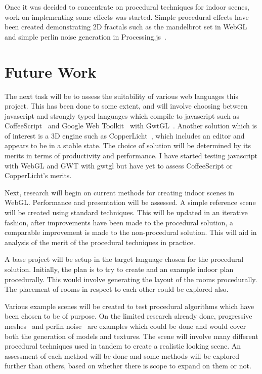 \documentclass[12pt]{article}
\begin{document}
Once it was decided to concentrate on procedural techniques for indoor scenes, work on implementing some effects was started.
Simple procedural effects have been created demonstrating 2D fractals such as the mandelbrot set in WebGL and simple perlin noise generation in Processing.js~\cite{processingjs:web}.

\section{Future Work}
The next task will be to assess the suitability of various web languages this project.
This has been done to some extent, and will involve choosing between javascript and strongly typed languages which compile to javascript such as CoffeeScript~\cite{coffeescript:web} and Google Web Toolkit~\cite{gwt:web} with GwtGL~\cite{gwtgl:web}.
Another solution which is of interest is a 3D engine such as CopperLicht~\cite{copperlicht:web}, which includes an editor and appears to be in a stable state.
The choice of solution will be determined by its merits in terms of productivity and performance.
I have started testing javascript with WebGL and GWT with gwtgl but have yet to assess CoffeeScript or CopperLicht's merits.

Next, research will begin on current methods for creating indoor scenes in WebGL.
Performance and presentation will be assessed.
A simple reference scene will be created using standard techniques.
This will be updated in an iterative fashion, after improvements have been made to the procedural solution, a comparable improvement is made to the non-procedural solution.
This will aid in analysis of the merit of the procedural techniques in practice.

A base project will be setup in the target language chosen for the procedural solution.
Initially, the plan is to try to create and an example indoor plan procedurally. 
This would involve generating the layout of the rooms procedurally.
The placement of rooms in respect to each other could be explored also.

Various example scenes will be created to test procedural algorithms which have been chosen to be of purpose.
On the limited research already done, progressive meshes~\cite{Hoppe:1996:PM:237170.237216} and perlin noise~\cite{perlinimproved:web} are examples which could be done and would cover both the generation of models and textures.
The scene will involve many different procedural techniques used in tandem to create a realistic looking scene.
An assessment of each method will be done and some methods will be explored further than others, based on whether there is scope to expand on them or not.
\end{document}
